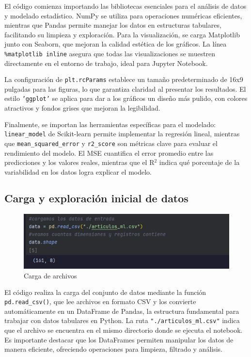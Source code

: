 \documentclass[12pt, a4paper]{article}
\begin{document}
El código comienza importando las bibliotecas esenciales para el análisis de datos y modelado estadístico. NumPy se utiliza para operaciones numéricas eficientes, mientras que Pandas permite manejar los datos en estructuras tabulares, facilitando su limpieza y exploración. Para la visualización, se carga Matplotlib junto con Seaborn, que mejoran la calidad estética de los gráficos. La línea \texttt{\%matplotlib inline} asegura que todas las visualizaciones se muestren directamente en el entorno de trabajo, ideal para Jupyter Notebook.

La configuración de \texttt{plt.rcParams} establece un tamaño predeterminado de 16x9 pulgadas para las figuras, lo que garantiza claridad al presentar los resultados. El estilo \texttt{'ggplot'} se aplica para dar a los gráficos un diseño más pulido, con colores atractivos y fondos grises que mejoran la legibilidad.

Finalmente, se importan las herramientas específicas para el modelado: \texttt{linear\_model} de Scikit-learn permite implementar la regresión lineal, mientras que \texttt{mean\_squared\_error} y \texttt{r2\_score} son métricas clave para evaluar el rendimiento del modelo. El MSE cuantifica el error promedio entre las predicciones y los valores reales, mientras que el R$^2$ indica qué porcentaje de la variabilidad en los datos logra explicar el modelo.

\subsection{Carga y exploración inicial de datos}

\begin{figure}[H]
    \centering
    \includegraphics[width=1.0\textwidth]{Actividad-9/Imagen2.png}
    \caption{Carga de archivos}
\end{figure}

El código realiza la carga del conjunto de datos mediante la función \texttt{pd.read\_csv()}, que lee archivos en formato CSV y los convierte automáticamente en un DataFrame de Pandas, la estructura fundamental para trabajar con datos tabulares en Python. La ruta \texttt{"./articulos\_ml.csv"} indica que el archivo se encuentra en el mismo directorio donde se ejecuta el notebook. Es importante destacar que los DataFrames permiten manipular los datos de manera eficiente, ofreciendo operaciones para limpieza, filtrado y análisis.
\end{document}
